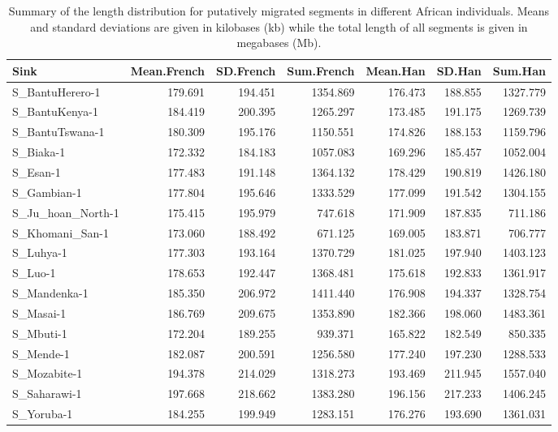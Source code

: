 \begin{table}[ht]
\centering
\begin{tabular}{lrrrrrr}
  \hline
Sink & Mean.French & SD.French & Sum.French & Mean.Han & SD.Han & Sum.Han \\ 
  \hline
S\_BantuHerero-1 & 179.691 & 194.451 & 1354.869 & 176.473 & 188.855 & 1327.779 \\ 
  S\_BantuKenya-1 & 184.419 & 200.395 & 1265.297 & 173.485 & 191.175 & 1269.739 \\ 
  S\_BantuTswana-1 & 180.309 & 195.176 & 1150.551 & 174.826 & 188.153 & 1159.796 \\ 
  S\_Biaka-1 & 172.332 & 184.183 & 1057.083 & 169.296 & 185.457 & 1052.004 \\ 
  S\_Esan-1 & 177.483 & 191.148 & 1364.132 & 178.429 & 190.819 & 1426.180 \\ 
  S\_Gambian-1 & 177.804 & 195.646 & 1333.529 & 177.099 & 191.542 & 1304.155 \\ 
  S\_Ju\_hoan\_North-1 & 175.415 & 195.979 & 747.618 & 171.909 & 187.835 & 711.186 \\ 
  S\_Khomani\_San-1 & 173.060 & 188.492 & 671.125 & 169.005 & 183.871 & 706.777 \\ 
  S\_Luhya-1 & 177.303 & 193.164 & 1370.729 & 181.025 & 197.940 & 1403.123 \\ 
  S\_Luo-1 & 178.653 & 192.447 & 1368.481 & 175.618 & 192.833 & 1361.917 \\ 
  S\_Mandenka-1 & 185.350 & 206.972 & 1411.440 & 176.908 & 194.337 & 1328.754 \\ 
  S\_Masai-1 & 186.769 & 209.675 & 1353.890 & 182.366 & 198.060 & 1483.361 \\ 
  S\_Mbuti-1 & 172.204 & 189.255 & 939.371 & 165.822 & 182.549 & 850.335 \\ 
  S\_Mende-1 & 182.087 & 200.591 & 1256.580 & 177.240 & 197.230 & 1288.533 \\ 
  S\_Mozabite-1 & 194.378 & 214.029 & 1318.273 & 193.469 & 211.945 & 1557.040 \\ 
  S\_Saharawi-1 & 197.668 & 218.662 & 1383.280 & 196.156 & 217.233 & 1406.245 \\ 
  S\_Yoruba-1 & 184.255 & 199.949 & 1283.151 & 176.276 & 193.690 & 1361.031 \\ 
   \hline
\end{tabular}
\caption{Summary of the length distribution for putatively migrated segments in different African individuals. Means and standard deviations are given in kilobases (kb) while the total length of all segments is given in megabases (Mb).} 
\label{table:lengths}
\end{table}
